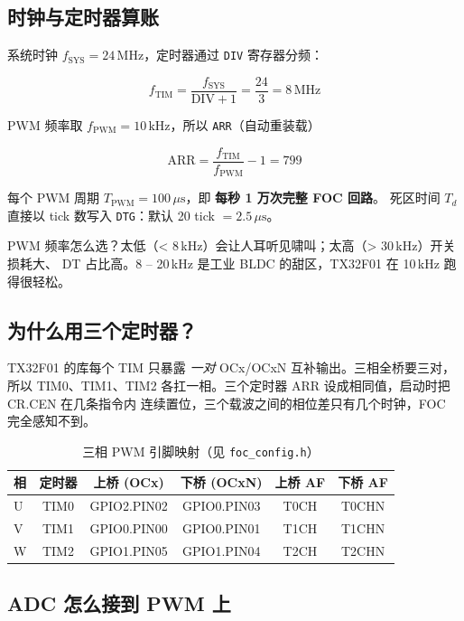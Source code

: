 \documentclass[UTF8,a4paper,11pt]{ctexart}
\newcommand{\reg}[1]{\texttt{#1}}
\begin{document}
\subsection{时钟与定时器算账}

系统时钟 $f_\text{SYS} = 24\,\text{MHz}$，定时器通过 \reg{DIV} 寄存器分频：

\[
  f_\text{TIM} = \frac{f_\text{SYS}}{\text{DIV}+1} = \frac{24}{3} = 8\,\text{MHz}
\]

PWM 频率取 $f_\text{PWM} = 10\,\text{kHz}$，所以 \reg{ARR}（自动重装载）

\[
  \text{ARR} = \frac{f_\text{TIM}}{f_\text{PWM}} - 1 = 799
\]

每个 PWM 周期 $T_\text{PWM} = 100\,\mu\text{s}$，即 \textbf{每秒 1 万次完整 FOC 回路}。
死区时间 $T_d$ 直接以 tick 数写入 \reg{DTG}：默认 20 tick $= 2.5\,\mu\text{s}$。

\begin{intuition}
PWM 频率怎么选？太低（< 8\,kHz）会让人耳听见啸叫；太高（> 30\,kHz）开关损耗大、
DT 占比高。8 -- 20\,kHz 是工业 BLDC 的甜区，TX32F01 在 10\,kHz 跑得很轻松。
\end{intuition}

\subsection{为什么用三个定时器？}

TX32F01 的库每个 TIM 只暴露 \emph{一对} OCx/OCxN 互补输出。三相全桥要三对，所以
TIM0、TIM1、TIM2 各扛一相。三个定时器 ARR 设成相同值，启动时把 CR.CEN 在几条指令内
连续置位，三个载波之间的相位差只有几个时钟，FOC 完全感知不到。

\begin{table}[h]
\centering
\caption{三相 PWM 引脚映射（见 \texttt{foc\_config.h}）}
\begin{tabular}{lccccc}
\toprule
相 & 定时器 & 上桥 (OCx) & 下桥 (OCxN) & 上桥 AF & 下桥 AF \\
\midrule
U & TIM0 & GPIO2.PIN02 & GPIO0.PIN03 & T0CH & T0CHN \\
V & TIM1 & GPIO0.PIN00 & GPIO0.PIN01 & T1CH & T1CHN \\
W & TIM2 & GPIO1.PIN05 & GPIO1.PIN04 & T2CH & T2CHN \\
\bottomrule
\end{tabular}
\end{table}

\subsection{ADC 怎么接到 PWM 上}
\end{document}
